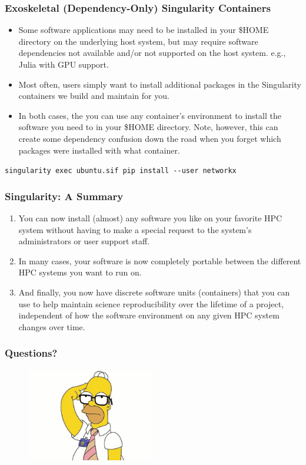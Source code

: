 \documentclass{beamer}
\begin{document}
\begin{frame}
   \frametitle{Exoskeletal (Dependency-Only) Singularity Containers}
   \begin{itemize}
      \setlength\itemsep{1.0em}
      \item Some software applications may need to be installed in your 
         \$HOME directory on the underlying host system, but may require 
         software dependencies not available and/or not supported on the 
         host system. e.g., Julia with GPU support.
      \item Most often, users simply want to install additional packages 
         in the Singularity containers we build and maintain for you.
      \item In both cases, the you can use any container's environment to 
         install the software you need to in your \$HOME directory. 
         Note, however, this can create some dependency confusion down 
         the road when you forget which packages were installed with 
         what container. 
   \end{itemize}
   \lstinline{singularity exec ubuntu.sif pip install --user networkx}
\end{frame}

\begin{frame}
   \frametitle{Singularity: A Summary}
   \begin{enumerate}
      \setlength\itemsep{1.0em}
      \item You can now install (almost) any software you like on your 
         favorite HPC system without having to make a special request 
         to the system's administrators or user support staff.
      \item In many cases, your software is now completely portable 
         between the different HPC systems you want to run on.
      \item And finally, you now have discrete software units 
         (containers) that you can use to help maintain science 
         reproducibility over the lifetime of a project, independent of 
         how the software environment on any given HPC system changes 
         over time.
   \end{enumerate}
\end{frame}

\begin{frame}
   \frametitle{Questions?}
   \vspace{-1.0em}
   \begin{figure}[htbp]
      \includegraphics[width=0.5\textwidth]{images/homer-simpson-glasses.jpg}
   \end{figure}
\end{frame}
\end{document}
